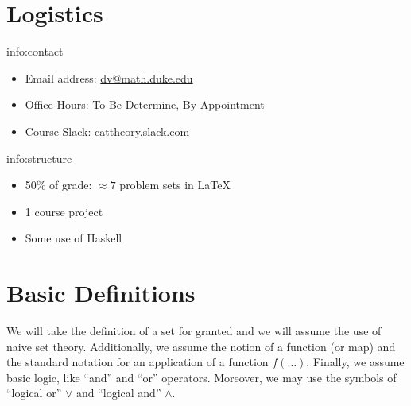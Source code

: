 



\section{Logistics}\label{sec:logistics}

\begin{info}{info:contact}
    \begin{itemize}
        \item Email address: \href{mailto:dv@math.duke.edu}{dv@math.duke.edu}
        \item Office Hours: To Be Determine, By Appointment
        \item Course Slack: \href{cattheory.slack.com}{cattheory.slack.com}
    \end{itemize}
\end{info}

\begin{info}{info:structure}
    \begin{itemize}
        \item 50\% of grade: \( \approx 7 \) problem sets in \LaTeX
        \item 1 course project
        \item Some use of Haskell
    \end{itemize}
\end{info}

\section{Basic Definitions}\label{sec:definitions}

We will take the definition of a set for granted and we will assume the use of naive set theory.
Additionally, we assume the notion of a function (or map) and the standard notation for an application of a function \( f(\ldots) \).
Finally, we assume basic logic, like ``and'' and ``or'' operators.
Moreover, we may use the symbols of ``logical or'' \( \lor \) and ``logical and'' \( \land \).

